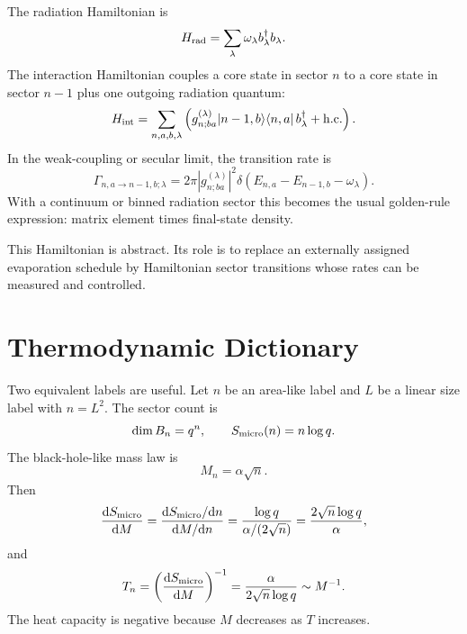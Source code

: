 \documentclass[aps,prd,onecolumn,longbibliography,nofootinbib]{revtex4-2}
\newcommand{\dd}{\mathrm{d}}
\newcommand{\Smicro}{S_{\rm micro}}
\begin{document}
The radiation Hamiltonian is
\begin{equation}
    H_{\rm rad}=\sum_\lambda \omega_\lambda
    b_\lambda^\dagger b_\lambda .
\end{equation}
The interaction Hamiltonian couples a core state in sector $n$ to a core state
in sector $n-1$ plus one outgoing radiation quantum:
\begin{equation}
    H_{\rm int}
    =
    \sum_{n,a,b,\lambda}
    \left(
        g^{(\lambda)}_{n;b a}
        |n-1,b\rangle\langle n,a|\, b_\lambda^\dagger
        +{\rm h.c.}
    \right).
\end{equation}
In the weak-coupling or secular limit, the transition rate is
\begin{equation}
    \Gamma_{n,a\rightarrow n-1,b;\lambda}
    =
    2\pi
    \left|g^{(\lambda)}_{n;b a}\right|^2
    \delta(E_{n,a}-E_{n-1,b}-\omega_\lambda).
\end{equation}
With a continuum or binned radiation sector this becomes the usual
golden-rule expression: matrix element times final-state density.

This Hamiltonian is abstract.  Its role is to replace an externally assigned
evaporation schedule by Hamiltonian sector transitions whose rates can be
measured and controlled.

\section{Thermodynamic Dictionary}
\label{sec:thermo}

Two equivalent labels are useful.  Let $n$ be an area-like label and $L$ be a
linear size label with $n=L^2$.  The sector count is
\begin{equation}
    \dim B_n=q^n,\qquad \Smicro(n)=n\log q .
\end{equation}
The black-hole-like mass law is
\begin{equation}
    M_n=\alpha\sqrt n .
\end{equation}
Then
\begin{equation}
    \frac{\dd \Smicro}{\dd M}
    =
    \frac{\dd \Smicro/\dd n}{\dd M/\dd n}
    =
    \frac{\log q}{\alpha/(2\sqrt n)}
    =
    \frac{2\sqrt n\log q}{\alpha},
\end{equation}
and
\begin{equation}
    T_n=\left(\frac{\dd \Smicro}{\dd M}\right)^{-1}
    =
    \frac{\alpha}{2\sqrt n\log q}
    \sim M^{-1}.
\end{equation}
The heat capacity is negative because $M$ decreases as $T$ increases.
\end{document}
